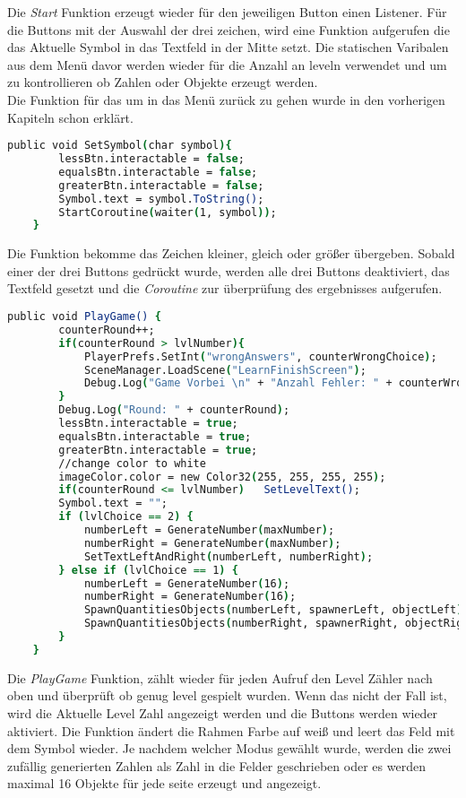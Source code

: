 Die \textit{Start} Funktion erzeugt wieder für den jeweiligen Button einen Listener. Für die Buttons mit der Auswahl der drei zeichen, wird eine Funktion aufgerufen die das Aktuelle Symbol in das Textfeld in der Mitte setzt. Die statischen Varibalen aus dem Menü davor werden wieder für die Anzahl an leveln verwendet und um zu kontrollieren ob Zahlen oder Objekte erzeugt werden.\\

Die Funktion für das um in das Menü zurück zu gehen wurde in den vorherigen Kapiteln schon erklärt.\\

\begin{lstlisting}[language=csh, caption={GameQuantities.cs SetSymbol Funktion}]
	public void SetSymbol(char symbol){
		lessBtn.interactable = false;
		equalsBtn.interactable = false;
		greaterBtn.interactable = false;
		Symbol.text = symbol.ToString();
		StartCoroutine(waiter(1, symbol));
	}
\end{lstlisting}
Die Funktion bekomme das Zeichen kleiner, gleich oder größer übergeben. Sobald einer der drei Buttons gedrückt wurde, werden alle drei Buttons deaktiviert, das Textfeld gesetzt und die \textit{Coroutine} zur überprüfung des ergebnisses aufgerufen.\\
\begin{lstlisting}[language=csh, caption={GameQuantities.cs PlayGame Funktion}]
	public void PlayGame() {
		counterRound++;
		if(counterRound > lvlNumber){
			PlayerPrefs.SetInt("wrongAnswers", counterWrongChoice);
			SceneManager.LoadScene("LearnFinishScreen");
			Debug.Log("Game Vorbei \n" + "Anzahl Fehler: " + counterWrongChoice);
		}
		Debug.Log("Round: " + counterRound);
		lessBtn.interactable = true;
		equalsBtn.interactable = true;
		greaterBtn.interactable = true;
		//change color to white
		imageColor.color = new Color32(255, 255, 255, 255);
		if(counterRound <= lvlNumber)	SetLevelText();
		Symbol.text = "";
		if (lvlChoice == 2) {
			numberLeft = GenerateNumber(maxNumber);
			numberRight = GenerateNumber(maxNumber);
			SetTextLeftAndRight(numberLeft, numberRight);
		} else if (lvlChoice == 1) {
			numberLeft = GenerateNumber(16);
			numberRight = GenerateNumber(16);
			SpawnQuantitiesObjects(numberLeft, spawnerLeft, objectLeft);
			SpawnQuantitiesObjects(numberRight, spawnerRight, objectRight);
		}
	}
\end{lstlisting}
Die \textit{PlayGame} Funktion, zählt wieder für jeden Aufruf den Level Zähler nach oben und überprüft ob genug level gespielt wurden. Wenn das nicht der Fall ist, wird die Aktuelle Level Zahl angezeigt werden und die Buttons werden wieder aktiviert. Die Funktion ändert die Rahmen Farbe auf weiß und leert das Feld mit dem Symbol wieder. Je nachdem welcher Modus gewählt wurde, werden die zwei zufällig generierten Zahlen als Zahl in die Felder geschrieben oder es werden maximal 16 Objekte für jede seite erzeugt und angezeigt.\\
